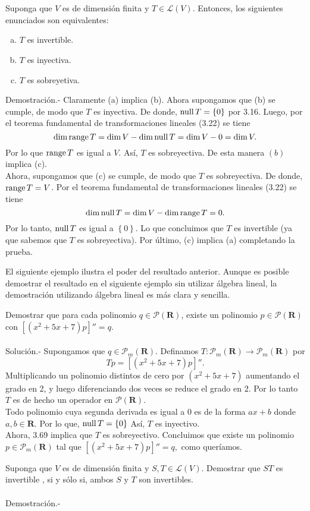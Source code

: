 \setcounter{myteo}{68}
\begin{myteo}\;\\\\
    Suponga que $V$ es de dimensión finita y $T\in \mathcal{L}(V)$. Entonces, los siguientes enunciados son equivalentes:
    \begin{enumerate}[(a)]
	\item $T$ es invertible.
	\item $T$ es inyectiva.
	\item $T$ es sobreyetiva.
    \end{enumerate}
    \vspace{.5cm}
	Demostración.- Claramente (a) implica (b). Ahora supongamos que (b) se cumple, de modo que $T$ es inyectiva. De donde, $\operatorname{null} T=\left\{0\right\}$ por 3.16. Luego, por el teorema fundamental de transformaciones lineales (3.22) se tiene
	$$\dim \operatorname{range} T = \dim V - \dim \operatorname{null} T = \dim V - 0 = \dim V.$$
	Por lo que $\operatorname{range} T$ es igual a $V$. Así, $T$ es sobreyectiva. De esta manera $(b)$ implica (c).\\
	Ahora, supongamos que (c) se cumple, de modo que $T$ es sobreyectiva. De donde, $\operatorname{range} T=V$. Por el teorema fundamental de transformaciones lineales (3.22) se tiene
	$$\dim \operatorname{null} T = \dim V - \dim \operatorname{range} T = 0.$$
	Por lo tanto, $\operatorname{null} T$ es igual a $\left\{0\right\}$. Lo que concluimos que $T$ es invertible (ya que sabemos que $T$ es sobreyectiva). Por último, (c) implica (a) completando la prueba.
\end{myteo}

El siguiente ejemplo ilustra el poder del resultado anterior. Aunque es posible demostrar el resultado en el siguiente ejemplo sin utilizar álgebra lineal, la demostración utilizando álgebra lineal es más clara y sencilla.

\begin{myejem}
    Demostrar que para cada polinomio $q\in \mathcal{P}(\textbf{R})$, existe un polinomio $p\in \mathcal{P}(\textbf{R})$ con $\left[\left(x^2+5x+7\right)p\right]''=q$.\\\\
	Solución.-\; Supongamos que $q\in \mathcal{P}_m(\textbf{R})$. Definamos $T:\mathcal{P}_m(\textbf{R})\to \mathcal{P}_m(\textbf{R})$ por
	$$Tp=\left[\left(x^2+5x+7\right)p\right]''.$$
	Multiplicando un polinomio distintos de cero por $\left(x^2+5x+7\right)$ aumentando el grado en 2, y luego diferenciando dos veces se reduce el grado en 2. Por lo tanto $T$ es de hecho un operador en $\mathcal{P}(\textbf{R})$.\\
	Todo polinomio cuya segunda derivada es igual a $0$ es de la forma $ax+b$ donde $a,b\in \textbf{R}$. Por lo que, $\operatorname{null} T=\left\{0\right\}$ Así, $T$ es inyectivo.\\
	Ahora, 3.69 implica que $T$ es sobreyectivo. Concluimos que existe un polinomio $p\in \mathcal{P}_m(\textbf{R})$ tal que $\left[\left(x^2+5x+7\right)p\right]''=q,$ como queríamos.
\end{myejem}


\begin{lema}
    Suponga que $V$ es de dimensión finita y $S,T\in \mathcal{L}(V)$. Demostrar que $ST$ es invertible , si y sólo si, ambos $S$ y $T$ son invertibles.\\\\
	Demostración.-\; 
\end{lema}


